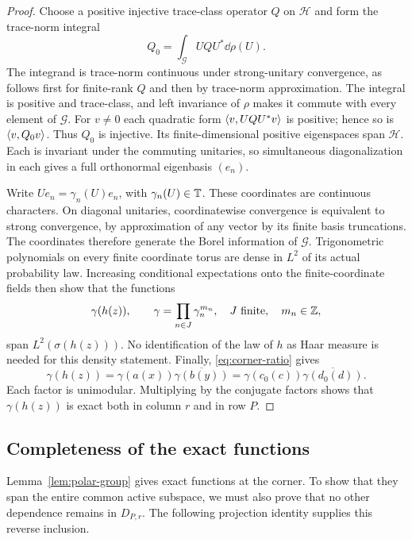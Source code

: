\begin{proof}
Choose a positive injective trace-class operator $Q$ on $\mathcal H$ and
form the trace-norm integral
\[
 Q_0=\int_{\mathcal G}UQU^*\dd\rho(U).
\]
The integrand is trace-norm continuous under strong-unitary convergence,
as follows first for finite-rank $Q$ and then by trace-norm approximation.
The integral is positive and trace-class, and left invariance of $\rho$
makes it commute with every element of $\mathcal G$.  For $v\ne0$ each
quadratic form $\langle v,UQU^*v\rangle$ is positive; hence so is
$\langle v,Q_0v\rangle$.  Thus $Q_0$ is injective.  Its finite-dimensional positive
eigenspaces span $\mathcal H$.  Each is invariant under the commuting
unitaries, so simultaneous diagonalization in each gives a full
orthonormal eigenbasis $(e_n)$.

Write $Ue_n=\gamma_n(U)e_n$, with $\gamma_n(U)\in\mathbb T$.
These coordinates are continuous characters.  On diagonal unitaries,
coordinatewise convergence is equivalent to strong convergence, by
approximation of any vector by its finite basis truncations.  The
coordinates therefore generate the Borel information of $\mathcal G$.
Trigonometric polynomials on every finite coordinate torus are dense in
$L^2$ of its actual probability law.  Increasing conditional expectations
onto the finite-coordinate fields then show that the functions
\[
 \gamma(h(z)),\qquad
 \gamma=\prod_{n\in J}\gamma_n^{m_n},\quad
 J\text{ finite},\quad m_n\in\mathbb Z,
\]
span $L^2(\sigma(h(z)))$.  No identification of the law of $h$ as Haar
measure is needed for this density statement.
Finally, \eqref{eq:corner-ratio} gives
\[
 \gamma(h(z))
 =\gamma(a(x))\overline{\gamma(b(y))}
 =\gamma(c_0(c))\overline{\gamma(d_0(d))}.
\]
Each factor is unimodular.  Multiplying by the conjugate factors shows
that $\gamma(h(z))$ is exact both in column $r$ and in row $P$.
\end{proof}

\subsection{Completeness of the exact functions}

Lemma~\ref{lem:polar-group} gives exact functions at the corner.  To show
that they span the entire common active subspace, we must also prove
that no other dependence remains in $D_{P,r}$.  The following projection
identity supplies this reverse inclusion.

